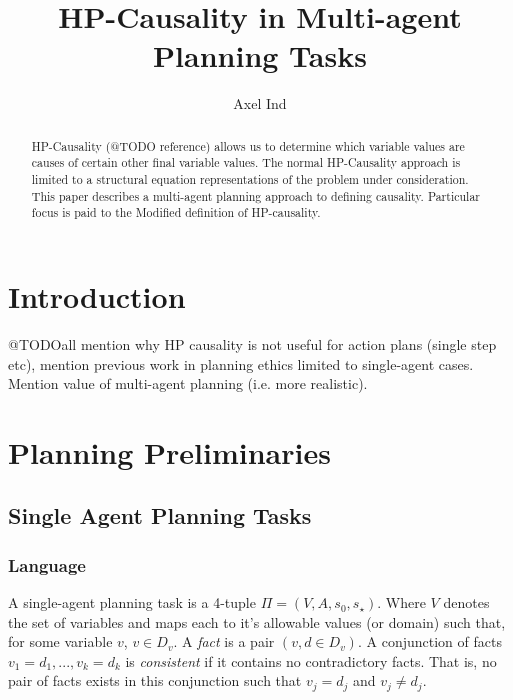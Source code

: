 \documentclass{article}
\theoremstyle{plain}
\theoremstyle{definition}
\begin{document}
\title{HP-Causality in Multi-agent Planning Tasks}
\author{Axel Ind}

\maketitle

\begin{abstract}
HP-Causality (@TODO reference) allows us to determine which variable values are causes of certain other final variable values. The normal HP-Causality approach is limited to a structural equation representations of the problem under consideration. This paper describes a multi-agent planning approach to defining causality. Particular focus is paid to the Modified definition of HP-causality.
\end{abstract}

\section{Introduction}
@TODOall mention why HP causality is not useful for action plans (single step etc), mention previous work in planning ethics limited to single-agent cases. Mention value of multi-agent planning (i.e. more realistic).

\section{Planning Preliminaries}

\subsection{Single Agent Planning Tasks}
\subsubsection*{Language}
A single-agent planning task is a 4-tuple $\Pi=(V, A, s_0, s_\star)$. Where $V$ denotes the set of variables and maps each to it's allowable values (or domain) such that, for some variable $v$, $v \in D_v$. A \textit{fact} is a pair $(v, d \in D_v)$. A conjunction of facts $v_1=d_1,...,v_k=d_k$ is \textit{consistent} if it contains no contradictory facts. That is, no pair of facts exists in this conjunction such that $v_j=d_j$ and $v_j \neq d_j$.
\end{document}
